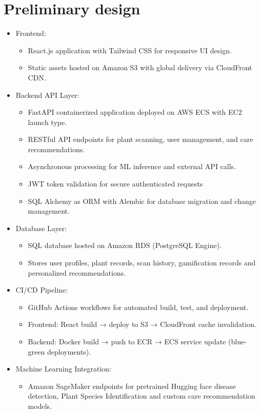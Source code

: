 \documentclass[11pt]{article}
\begin{document}
\section{Preliminary design}

\begin{itemize}
    \item Frontend:
    \begin{itemize}
        \item React.js application with Tailwind CSS for responsive UI design.
        \item Static assets hosted on Amazon S3 with global delivery via CloudFront CDN.
    \end{itemize}
    \item Backend API Layer:
    \begin{itemize}
        \item FastAPI containerized application deployed on AWS ECS with EC2 launch type.
        \item RESTful API endpoints for plant scanning, user management, and care recommendations.
        \item Asynchronous processing for ML inference and external API calls.
        \item JWT token validation for secure authenticated requests
        \item SQL Alchemy as ORM with Alembic for database migration and change management.
    \end{itemize}
    \item Database Layer:
    \begin{itemize}
        \item SQL database hosted on Amazon RDS (PostgreSQL Engine).
        \item Stores user profiles, plant records, scan history, gamification records and personalized recommendations.
    \end{itemize}
    \item CI/CD Pipeline:
    \begin{itemize}
        \item GitHub Actions workflows for automated build, test, and deployment.
        \item Frontend: React build → deploy to S3 → CloudFront cache invalidation.
        \item Backend: Docker build → push to ECR → ECS service update (blue-green deployments).
    \end{itemize}
    \item Machine Learning Integration:
    \begin{itemize}
        \item Amazon SageMaker endpoints for pretrained Hugging face disease detection, Plant Species Identification and custom care recommendation models.
    \end{itemize}
\end{itemize}
\end{document}
